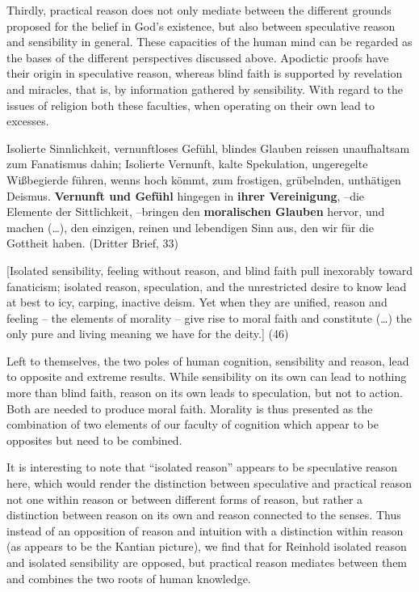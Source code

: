 Thirdly, practical reason does not only mediate between the different grounds proposed for the belief in God's existence, but also between speculative reason and sensibility in general. These capacities of the human mind can be regarded as the bases of the different perspectives discussed above. Apodictic proofs have their origin in speculative reason, whereas blind faith is supported by revelation and miracles, that is, by information gathered by sensibility. With regard to the issues of religion both these faculties, when operating on their own lead to excesses. 

Isolierte Sinnlichkeit, vernunftloses Gef\"{u}hl, blindes Glauben reissen unaufhaltsam zum Fanatismus dahin; Isolierte Vernunft, kalte Spekulation, ungeregelte Wi\ss{}begierde f\"{u}hren, wenns hoch k\"{o}mmt, zum frostigen, gr\"{u}belnden, unth\"{a}tigen Deismus. \textbf{Vernunft und Gef\"{u}hl} hingegen in \textbf{ihrer Vereinigung}, {--}die Elemente der Sittlichkeit, {--}bringen den \textbf{moralischen Glauben }hervor, und machen (\ldots ), den einzigen, reinen und lebendigen Sinn aus, den wir f\"{u}r die Gottheit haben. (Dritter Brief, 33)

[Isolated sensibility, feeling without reason, and blind faith pull inexorably toward fanaticism; isolated reason, speculation, and the unrestricted desire to know lead at best to icy, carping, inactive deism. Yet when they are unified, reason and feeling {--} the elements of morality {--} give rise to moral faith and constitute (\ldots ) the only pure and living meaning we have for the deity.] (46)

Left to themselves, the two poles of human cognition, sensibility and reason, lead to opposite and extreme results. While sensibility on its own can lead to nothing more than blind faith, reason on its own leads to speculation, but not to action. Both are needed to produce moral faith. Morality is thus presented as the combination of two elements of our faculty of cognition which appear to be opposites but need to be combined. 

 It is interesting to note that ``isolated reason'' appears to be speculative reason here, which would render the distinction between speculative and practical reason not one within reason or between different forms of reason, but rather a distinction between reason on its own and reason connected to the senses. Thus instead of an opposition of reason and intuition with a distinction within reason (as appears to be the Kantian picture), we find that for Reinhold isolated reason and isolated sensibility are opposed, but practical reason mediates between them and combines the two roots of human knowledge. 

